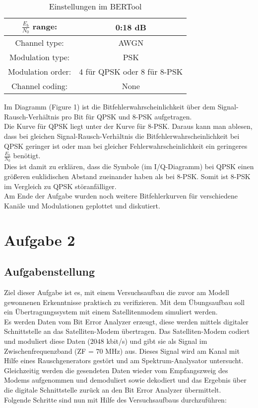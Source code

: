 \documentclass[12pt,a4paper,ngerman]{article}
\begin{document}
\begin{table}[h!]
\begin{center}
\begin{tabular}{ |c|c| }

  \hline
  $\frac{E_b}{N_0}$ range: & 0:18 dB \\
  \hline
  Channel type: & AWGN \\ \hline
  Modulation type: & PSK \\ \hline
  Modulation order: & 4 für QPSK oder 8 für 8-PSK \\ \hline
  Channel coding: & None \\
  \hline
\end{tabular}
\caption{Einstellungen im BERTool}
\label{tab:BERTool}
\end{center}
\end{table}


Im Diagramm (Figure 1) ist die Bitfehlerwahrscheinlichkeit über dem Signal-Rausch-Verhältnis pro Bit für QPSK und 8-PSK aufgetragen. \\
Die Kurve für QPSK liegt unter der Kurve für 8-PSK. Daraus kann man ablesen, dass bei gleichen Signal-Rausch-Verhältnis die Bitfehlerwahrscheinlichkeit bei QPSK geringer ist oder man bei gleicher Fehlerwahrscheinlichkeit ein geringeres $\frac{E_b}{N_0}$ benötigt. \\
Dies ist damit zu erklären, dass die Symbole (im I/Q-Diagramm) bei QPSK einen größeren euklidischen Abstand zueinander haben als bei 8-PSK. Somit ist 8-PSK im Vergleich zu QPSK störanfälliger. \\
Am Ende der Aufgabe wurden noch weitere Bitfehlerkurven für verschiedene Kanäle und Modulationen geplottet und diskutiert.




\pagebreak
\section{Aufgabe 2}
\subsection{Aufgabenstellung}
Ziel dieser Aufgabe ist es, mit einem Versuchsaufbau die zuvor am Modell gewonnenen Erkenntnisse praktisch zu verifizieren. Mit dem Übungsaufbau soll ein Übertragungssystem mit einem Satellitenmodem simuliert werden. \\
Es werden Daten vom Bit Error Analyzer erzeugt, diese werden mittels digitaler Schnittstelle an das Satelliten-Modem übertragen. Das Satelliten-Modem codiert und moduliert diese Daten ($2048$ kbit/s) und gibt sie als Signal im Zwischenfrequenzband (ZF = $70$ MHz) aus. Dieses Signal wird am Kanal mit Hilfe eines Rauschgenerators gestört und am Spektrum-Analysator untersucht. Gleichzeitig werden die gesendeten Daten wieder vom Empfangszweig des Modems aufgenommen und demoduliert sowie dekodiert und das Ergebnis über die digitale Schnittstelle zurück an den Bit Error Analyzer übermittelt. \\
Folgende Schritte sind nun mit Hilfe des Versuchsaufbaus durchzuführen:
\end{document}
